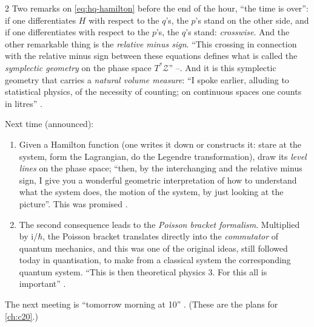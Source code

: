 \begin{paracol}{2}
Two remarks on \eqref{eq:hq-hamilton} before the end of the hour, ``the time is over'': if one differentiates $H$ with respect to the $q$'s, the $p$'s stand on the other side, and if one differentiates with respect to the $p$'s, the $q$'s stand: \emph{crosswise}. And the other remarkable thing is the \emph{relative minus sign}. ``This crossing in connection with the relative minus sign between these equations defines what is called the \emph{symplectic geometry} on the phase space $T^*\mathcal Z$'' --. And it is this symplectic geometry that carries a \emph{natural volume measure}: ``I spoke earlier, alluding to statistical physics, of the necessity of counting; on continuous spaces one counts in litres'' .

Next time (announced):
\begin{enumerate}
  \item Given a Hamilton function (one writes it down or constructs it: stare at the system, form the Lagrangian, do the Legendre transformation), draw its \emph{level lines} on the phase space; ``then, by the interchanging and the relative minus sign, I give you a wonderful geometric interpretation of how to understand what the system does, the motion of the system, by just looking at the picture''. This was promised .
  \item The second consequence leads to the \emph{Poisson bracket formalism}. Multiplied by $\mathrm i/\hbar$, the Poisson bracket translates directly into the \emph{commutator} of quantum mechanics, and this was one of the original ideas, still followed today in quantisation, to make from a classical system the corresponding quantum system. ``This is then theoretical physics 3. For this all is important'' .
\end{enumerate}
The next meeting is ``tomorrow morning at 10'' . (These are the plans for \cref{ch:c20}.)


\end{paracol}
